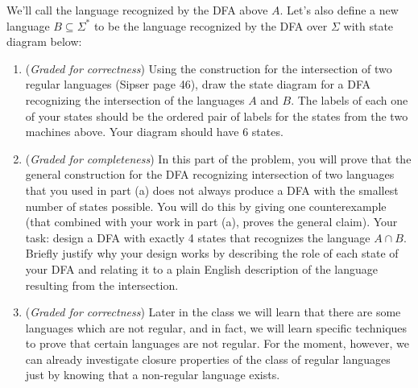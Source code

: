 \documentclass[12pt, oneside]{article}
\newcommand{\gradeCorrect}{({\it Graded for correctness}) }
\newcommand{\gradeComplete}{({\it Graded for completeness}) }
\begin{document}
\begin{enumerate}
\begin{center}
\end{center}
We'll call the language recognized by the DFA above $A$.
Let's also define a new language $B \subseteq \Sigma^*$ to be 
the language recognized by the DFA 
over $\Sigma$ with state diagram below:
\begin{center}
\end{center}

\begin{enumerate}
    \item\gradeCorrect Using the construction for the intersection of two regular languages (Sipser page 46), 
    draw the state diagram for a DFA recognizing the intersection of the languages $A$ and $B$. The labels of 
    each one of your states should be the ordered pair of labels for the states from the two machines above. 
    Your diagram should have $6$ states.
    \item\gradeComplete In this part of the problem, you will prove that the general construction for the DFA 
    recognizing intersection of two languages that 
    you used in part (a) does not always produce a DFA
    with the smallest number of states possible. 
    You will do this by giving one counterexample (that combined with your work in part (a), 
    proves the general claim). Your task: design a DFA with exactly 4 states that recognizes 
    the language $A \cap B$. Briefly justify why your design works by describing the role of each state
    of your DFA and relating it to a plain English description of the language resulting from the intersection.
    \item\gradeCorrect  Later in the class we will learn that there are some languages which are not regular, 
    and in fact, we will learn specific techniques to prove that certain languages are not regular. 
    For the moment, however, we can already investigate closure properties of the class of regular 
    languages just by knowing that a non-regular language exists. 


\end{enumerate}
\end{enumerate}
\end{document}
